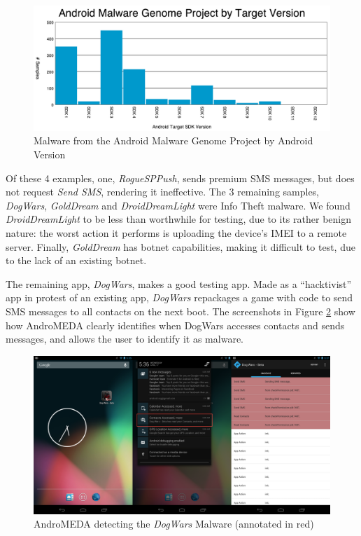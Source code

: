 \begin{figure}[h]
\begin{center}
\includegraphics[width=1.0\columnwidth]{figs/MalwareAndSDK}
\caption{Malware from the Android Malware Genome Project by Android Version }
\label{fig:malwaresdk}
\end{center}
\end{figure}

Of these 4 examples, one, \textit{RogueSPPush}, sends premium SMS messages, but does not request \textit{Send SMS}, rendering it ineffective. The 3 remaining samples, \textit{DogWars}, \textit{GoldDream} and \textit{DroidDreamLight} were Info Theft malware. We found \textit{DroidDreamLight} to be less than worthwhile for testing, due to its rather benign nature: the worst action it performs is uploading the device's IMEI to a remote server. Finally, \textit{GoldDream} has botnet capabilities, making it difficult to test, due to the lack of an existing botnet.

The remaining app, \textit{DogWars}, makes a good testing app. Made as a ``hacktivist'' app in protest of an existing app\citep{symantecdogwars}, \textit{DogWars} repackages a game with code to send SMS messages to all contacts on the next boot. The screenshots in Figure \ref{fig:dogwars_visual} show how AndroMEDA clearly identifies when DogWars accesses contacts and sends messages, and allows the user to identify it as malware.

\begin{figure}[h]
\begin{center}
\includegraphics[width=1.0\columnwidth]{figs/dogwars_detection}
\caption{AndroMEDA detecting the \textit{DogWars} Malware (annotated in red) }
\label{fig:dogwars_visual}
\end{center}
\end{figure}

